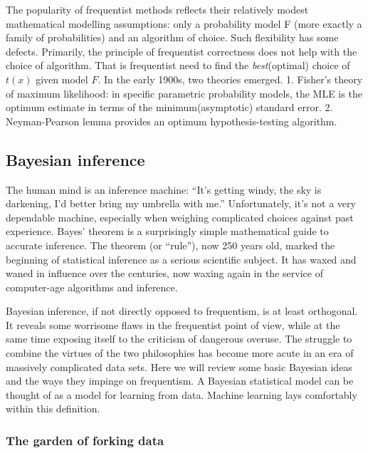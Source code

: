 \documentclass{article}
\begin{document}
The popularity of frequentist methods reflects their relatively modest
mathematical modelling assumptions: only a probability model F (more
exactly a family of probabilities) and an algorithm of choice. Such
flexibility has some defects. Primarily, the principle of frequentist
correctness does not help with the choice of algorithm. That is
frequentist need to find the \emph{best}(optimal) choice of \(t(x)\)
given model \(F\). In the early 1900s, two theories emerged. 1. Fisher's
theory of maximum likelihood: in specific parametric probability models,
the MLE is the optimum estimate in terms of the minimum(asymptotic)
standard error. 2. Neyman-Pearson lemma provides an optimum
hypothesis-testing algorithm.

\hypertarget{bayesian-inference}{%
\subsection{Bayesian inference}\label{bayesian-inference}}

The human mind is an inference machine: ``It's getting windy, the sky is
darkening, I'd better bring my umbrella with me.'' Unfortunately, it's
not a very dependable machine, especially when weighing complicated
choices against past experience. Bayes' theorem is a surprisingly simple
mathematical guide to accurate inference. The theorem (or ``rule''), now
250 years old, marked the beginning of statistical inference as a
serious scientific subject. It has waxed and waned in influence over the
centuries, now waxing again in the service of computer-age algorithms
and inference.

Bayesian inference, if not directly opposed to frequentism, is at least
orthogonal. It reveals some worrisome flaws in the frequentist point of
view, while at the same time exposing itself to the criticism of
dangerous overuse. The struggle to combine the virtues of the two
philosophies has become more acute in an era of massively complicated
data sets. Here we will review some basic Bayesian ideas and the ways
they impinge on frequentism. A Bayesian statistical model can be thought
of as a model for learning from data. Machine learning lays comfortably
within this definition.

\hypertarget{the-garden-of-forking-data}{%
\subsubsection{The garden of forking
data}\label{the-garden-of-forking-data}}
\end{document}
